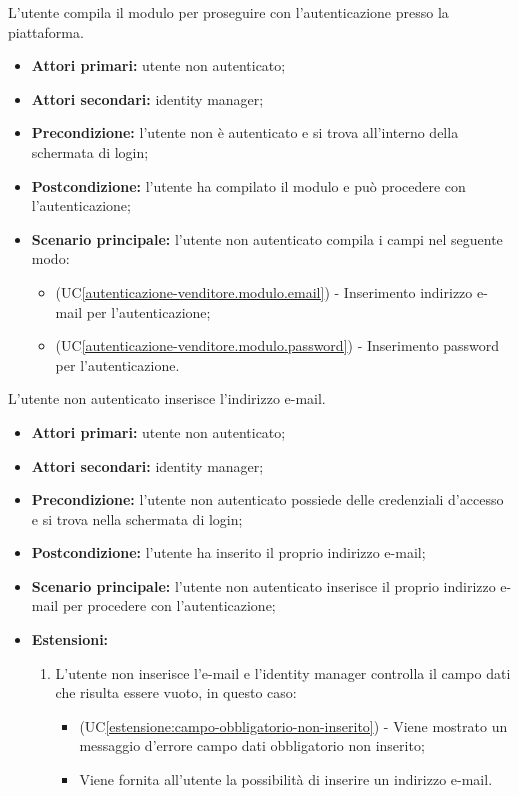 L'utente compila il modulo per proseguire con l'autenticazione presso la piattaforma.
\begin{itemize}
	\item \textbf{Attori primari:} utente non autenticato;
	\item \textbf{Attori secondari:} identity manager;
	\item \textbf{Precondizione:} l'utente non è autenticato e si trova all'interno della schermata di login;
	\item \textbf{Postcondizione:} l'utente ha compilato il modulo e può procedere con l'autenticazione;
	\item \textbf{Scenario principale:} l'utente non autenticato compila i campi nel seguente modo:
	\begin{itemize}
		\item (UC\ref{autenticazione-venditore.modulo.email}) - Inserimento indirizzo e-mail per l'autenticazione;
		\item (UC\ref{autenticazione-venditore.modulo.password}) - Inserimento password per l'autenticazione.
	\end{itemize}
\end{itemize}

\label{autenticazione-venditore.modulo.email}

L'utente non autenticato inserisce l'indirizzo e-mail.
\begin{itemize}
	\item \textbf{Attori primari:} utente non autenticato;
	\item \textbf{Attori secondari:} identity manager;
	\item \textbf{Precondizione:} l'utente non autenticato possiede delle credenziali d'accesso e si trova nella schermata di login;
	\item \textbf{Postcondizione:}  l'utente ha inserito il proprio indirizzo e-mail;
	\item \textbf{Scenario principale:} l'utente non autenticato inserisce il proprio indirizzo e-mail per procedere con l'autenticazione;
	\item \textbf{Estensioni:}
	\begin{enumerate}[label=\lett]
		\item L'utente non inserisce l'e-mail e l'identity manager controlla il campo dati che risulta essere vuoto, in questo caso:
		\begin{itemize}
			\item (UC\ref{estensione:campo-obbligatorio-non-inserito}) - Viene mostrato un messaggio d'errore campo dati obbligatorio non inserito;
			\item Viene fornita all'utente la possibilità di inserire un indirizzo e-mail.
		\end{itemize}
	\end{enumerate}
\end{itemize}

